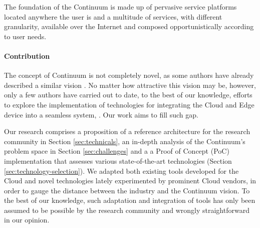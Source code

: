 The foundation of the Continuum is made up of pervasive service platforms located anywhere the user is and a multitude of services, with different granularity, available over the Internet and composed opportunistically according to user needs.


\paragraph{Contribution}

The concept of Continuum is not completely novel, as some authors have already described a similar vision \cite{latre2014fluid, beckman2020harnessing}. No matter how attractive this vision may be, however, only a few authors have carried out to date, to the best of our knowledge, efforts to explore the implementation of technologies for integrating the Cloud and Edge device into a seamless system, \cite{abdelbaky2017computing}. Our work aims to fill such gap.

Our research comprises a proposition of a reference architecture for the research community in Section \ref{sec:technicals}, an in-depth analysis of the Continuum's problem space in Section \ref{sec:challenges} and a a Proof of Concept (PoC) implementation that assesses various state-of-the-art technologies (Section \ref{sec:technology-selection}). We adapted both existing tools developed for the Cloud and novel technologies lately experimented by prominent Cloud vendors, in order to gauge the distance between the industry and the Continuum vision. To the best of our knowledge, such adaptation and integration of tools has only been assumed to be possible by the research community \cite{wasm-continuum} and wrongly straightforward in our opinion.

